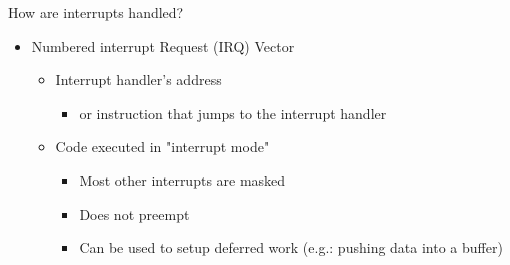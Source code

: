 \begin{frame}{\secname}
    How are interrupts handled?

    \begin{itemize}
        \item Numbered interrupt Request (IRQ) Vector
        \begin{itemize}
            \item Interrupt handler's address
            \begin{itemize}
                \item or instruction that jumps to the interrupt handler
            \end{itemize}
            \item Code executed in "interrupt mode"
            \begin{itemize}
                \item Most other interrupts are masked
                \item Does not preempt
                \item Can be used to setup deferred work
                      (e.g.: pushing data into a buffer)
            \end{itemize}
        \end{itemize}
    \end{itemize}
\end{frame}
